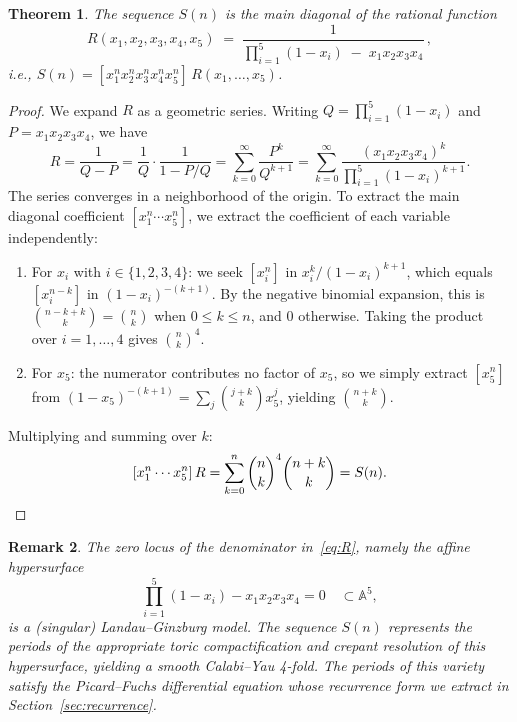 \documentclass[11pt, a4paper]{article}
\newtheorem{theorem}{Theorem}
\newtheorem{remark}[theorem]{Remark}
\begin{document}
\begin{theorem}\label{thm:diagonal}
The sequence $S(n)$ is the main diagonal of the rational function
\begin{equation}\label{eq:R}
  R(x_1, x_2, x_3, x_4, x_5) \;=\; \frac{1}{\prod_{i=1}^5 (1-x_i) \;-\; x_1 x_2 x_3 x_4}\,,
\end{equation}
i.e., $S(n) = [x_1^n x_2^n x_3^n x_4^n x_5^n]\, R(x_1,\dots,x_5)$.
\end{theorem}

\begin{proof}
We expand $R$ as a geometric series. Writing $Q = \prod_{i=1}^5 (1-x_i)$ and $P = x_1 x_2 x_3 x_4$, we have
\[
  R = \frac{1}{Q - P} = \frac{1}{Q}\cdot\frac{1}{1 - P/Q}
    = \sum_{k=0}^\infty \frac{P^k}{Q^{k+1}}
    = \sum_{k=0}^\infty \frac{(x_1 x_2 x_3 x_4)^k}{\prod_{i=1}^5 (1-x_i)^{k+1}}.
\]
The series converges in a neighborhood of the origin. To extract the main diagonal coefficient $[x_1^n \cdots x_5^n]$, we extract the coefficient of each variable independently:
\begin{enumerate}
    \item For $x_i$ with $i \in \{1,2,3,4\}$: we seek $[x_i^n]$ in $x_i^k / (1-x_i)^{k+1}$, which equals $[x_i^{n-k}]$ in $(1-x_i)^{-(k+1)}$. By the negative binomial expansion, this is $\binom{n-k+k}{k} = \binom{n}{k}$ when $0 \le k \le n$, and $0$ otherwise. Taking the product over $i=1,\dots,4$ gives $\binom{n}{k}^4$.
    \item For $x_5$: the numerator contributes no factor of $x_5$, so we simply extract $[x_5^n]$ from $(1-x_5)^{-(k+1)} = \sum_j \binom{j+k}{k} x_5^j$, yielding $\binom{n+k}{k}$.
\end{enumerate}
Multiplying and summing over $k$:
\[
  [x_1^n \cdots x_5^n]\, R = \sum_{k=0}^n \binom{n}{k}^4 \binom{n+k}{k} = S(n).  \qedhere
\]
\end{proof}

\begin{remark}\label{rmk:geometry}
The zero locus of the denominator in~\eqref{eq:R}, namely the affine hypersurface
\[
  \prod_{i=1}^5 (1-x_i) - x_1 x_2 x_3 x_4 = 0 \quad \subset \mathbb{A}^5,
\]
is a (singular) Landau--Ginzburg model. The sequence $S(n)$ represents the periods of the appropriate toric compactification and crepant resolution of this hypersurface, yielding a smooth Calabi--Yau 4-fold. The periods of this variety satisfy the Picard--Fuchs differential equation whose recurrence form we extract in Section~\ref{sec:recurrence}.
\end{remark}
\end{document}
